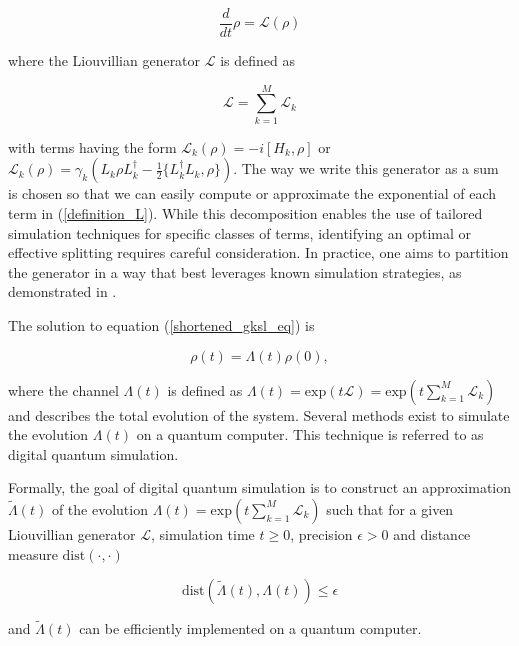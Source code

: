 \documentclass[pdflatex,sn-mathphys-num]{sn-jnl}%
\begin{document}
\begin{equation}
    \frac{d}{dt} \rho = \mathcal{L}(\rho)
\label{shortened_gksl_eq}
\end{equation}


\noindent where the Liouvillian generator $\mathcal{L}$ is defined as 

\begin{equation}
\mathcal{L} = \sum_{k=1}^M \mathcal{L}_k
\label{definition_L}
\end{equation}

\noindent with terms having the form $\mathcal{L}_{k}(\rho) = -i[H_{k},\rho]$ or $\mathcal{L}_{k}(\rho) = \gamma_k(L_k \rho L_k^\dagger - \frac{1}{2}\{L_k^\dagger L_k,\rho\})$. The way we write this generator as a sum is chosen so that we can easily compute or approximate the exponential of each term in (\ref{definition_L}). While this decomposition enables the use of tailored simulation techniques for specific classes of terms, identifying an optimal or effective splitting requires careful consideration. In practice, one aims to partition the generator in a way that best leverages known simulation strategies, as demonstrated in \cite{hagan2023composite}.

The solution to equation (\ref{shortened_gksl_eq}) is 

\begin{equation}
\rho(t) = \Lambda(t) \rho(0),
\label{gksl_sol}
\end{equation}

\noindent where the channel $\Lambda(t)$ is defined as $\Lambda(t) = \mathrm{exp}(t\mathcal{L})= \mathrm{exp}(t\sum_{k=1}^M \mathcal{L}_k)$ and describes the total evolution of the system. Several methods exist to simulate the evolution $\Lambda(t)$ on a quantum computer. This technique is referred to as digital quantum simulation. 

Formally, the goal of digital quantum simulation is to construct an approximation $\tilde{\Lambda} (t)$ of the evolution $\Lambda(t) = \mathrm{exp}(t\sum_{k=1}^M \mathcal{L}_k)$ such that for a given Liouvillian generator $\mathcal{L}$, simulation time $t\ge0$, precision $\epsilon >0$ and distance measure $\mathrm{dist}(\cdot,\cdot)$ 

\begin{equation}
\mathrm{dist}(\tilde{\Lambda} (t),\Lambda(t)) \le \epsilon
\end{equation}

\noindent and $\tilde{\Lambda} (t)$ can be efficiently implemented on a quantum computer. 
\end{document}
